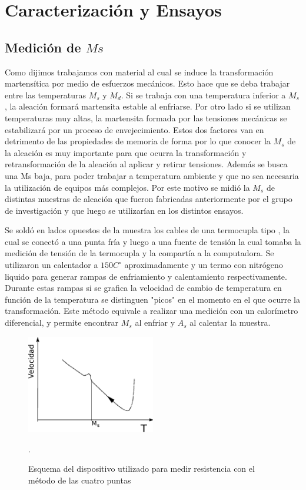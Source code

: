 \documentclass[a4paper,12pt,fleqn,twoside,openany]{book}
\begin{document}
\section{Caracterización y Ensayos}



\subsection{Medición de $Ms$}

Como dijimos trabajamos con material al cual se induce la transformación martensítica por medio de esfuerzos mecánicos. Esto hace que se deba trabajar entre las temperaturas 
$M_s$ y $M_d$. 
Si se trabaja con una temperatura inferior a $M_s$, la aleación formará martensita estable al enfriarse. Por otro lado si se utilizan temperaturas muy altas, la martensita 
formada  por las tensiones mecánicas se estabilizará por un proceso de envejecimiento. Estos dos factores van en detrimento de las propiedades de memoria de forma por lo que 
conocer la $M_s$ de la aleación es muy importante para que ocurra la 
transformación y retransformación de la aleación al aplicar y retirar tensiones. Además se busca una Ms baja, para poder trabajar a temperatura ambiente y que no sea necesaria 
la utilización de equipos más complejos. 
Por este motivo se midió la $M_s$ de distintas muestras de aleación que fueron fabricadas anteriormente por el grupo de investigación y que luego se utilizarían en los distintos 
ensayos.

Se soldó en lados opuestos de la muestra los cables de una termocupla tipo , la cual se conectó a una punta fría y luego a una fuente de tensión la 
cual tomaba la medición de tensión de la termocupla y la compartía a la computadora. Se utilizaron un calentador a $150 C^\circ$ aproximadamente y un termo 
con nitrógeno liquido para generar rampas
de enfriamiento y calentamiento respectivamente. Durante estas rampas si se grafica la velocidad de cambio de temperatura en función de la temperatura se
distinguen "picos" en el momento en el que ocurre la transformación. Este método equivale a realizar una medición con un calorímetro diferencial, y permite 
encontrar $M_s$ al enfriar y $A_s$ al calentar la muestra. 

\begin{figure}[h]
 \centering
 \includegraphics[width=0.5\textwidth]{Img/Procedimiento/Ms.eps}
 \caption{Esquema del dispositivo utilizado para medir resistencia con el método de las cuatro puntas}. 
 \label{fig:Ms}
 \end{figure}
\end{document}
